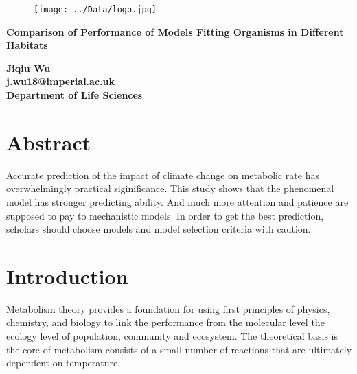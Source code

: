 \documentclass[11pt]{article}
\begin{document}
	\begin{titlepage}
		
		\begin{center}
			
		\begin{figure}[H]
		\centering
		\texttt{[image: ../Data/logo.jpg]}
	    \end{figure}

		
		\vspace*{3cm}
		\Huge
		\textbf{Comparison of Performance of Models Fitting Organisms in Different Habitats }\\
		
		\vspace{5cm}
		\Large
		
		\textbf{Jiqiu Wu}\\   
		\vspace*{1cm}
		\textbf{j.wu18@imperial.ac.uk}\\
		\vspace*{1cm}
		\textbf{Department of Life Sciences}\\
		\vspace*{1cm}
 
		
		\vspace{2cm}
		
		\end{center}

	\end{titlepage}
	
	\clearpage
	\tableofcontents
	
	
	\linenumbers
	\doublespacing
	\newpage
	\section*{Abstract}
Accurate prediction of the impact of climate change on metabolic rate has overwhelmingly practical siginificance. This study shows that the phenomenal model has stronger predicting ability. And much more attention and patience are supposed to pay to mechanistic models. In order to get the best prediction, scholars should choose models and model selection criteria with caution.
	
	
		
	\section{Introduction}
Metabolism theory provides a foundation for using first principles of physics, chemistry, and biology to link the performance from the molecular level\citep{allen2006kinetic} the ecology level of population\citep{savage2004effects}, community and ecosystem\citep{brown2004toward}. The theoretical basis is the core of metabolism consists of a small number of reactions that are ultimately dependent on temperature\citep{gillooly2001effects}.
\end{document}
